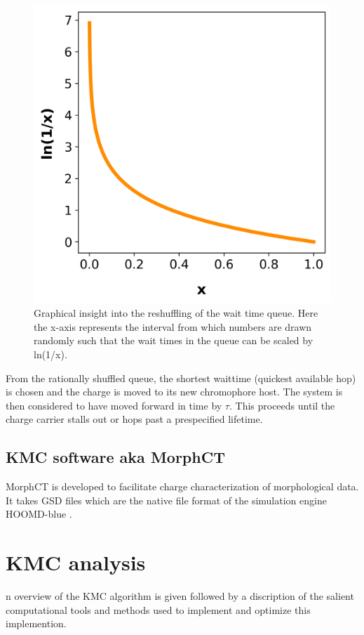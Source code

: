 \begin{figure}
  \center
  \includegraphics[width=0.8\linewidth]{figures/naturallog.png}
  \caption{Graphical insight into the reshuffling of the wait time queue. Here the x-axis represents the 
    interval from which numbers are drawn randomly such that the wait times in the queue can be scaled 
    by ln(1/x).}
  \label{fig:ln}
\end{figure}

From the rationally shuffled queue, the shortest waittime (quickest available hop) is chosen and the charge is moved to
its new chromophore host. The system is then considered to have moved forward in time by $\tau$. This proceeds
until the charge carrier stalls out or hops past a prespecified lifetime. 


    \subsection{KMC software aka MorphCT}

MorphCT is developed to facilitate charge characterization of morphological data. It takes GSD files which are
the native file format of the simulation engine HOOMD-blue \cite{Anderson2020a}.
\section{KMC analysis}

n overview of the KMC algorithm is given followed by a discription of the salient computational tools and
methods used to implement and optimize this implemention. 


